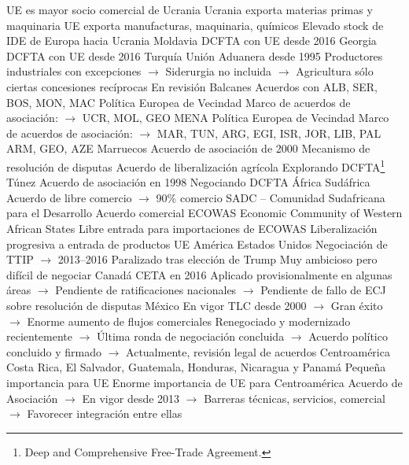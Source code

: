 \documentclass{nuevotema}
\begin{document}
\begin{esquemal}
				\4[] UE es mayor socio comercial de Ucrania
				\4[] Ucrania exporta materias primas y maquinaria
				\4[] UE exporta manufacturas, maquinaria, químicos
				\4[] Elevado stock de IDE de Europa hacia Ucrania
				\4 Moldavia
				\4[] DCFTA con UE desde 2016
				\4 Georgia
				\4[] DCFTA con UE desde 2016
				\4 Turquía
				\4[] Unión Aduanera desde 1995
				\4[] Productores industriales con excepciones
				\4[] $\to$ Siderurgia no incluida
				\4[] $\to$ Agricultura sólo ciertas concesiones recíprocas
				\4[] En revisión
				\4 Balcanes
				\4[] Acuerdos con ALB, SER, BOS, MON, MAC
				\4 Política Europea de Vecindad
				\4[] Marco de acuerdos de asociación:
				\4[] $\to$ UCR, MOL, GEO
			\3 MENA
				\4 Política Europea de Vecindad
				\4[] Marco de acuerdos de asociación:
				\4[] $\to$ MAR, TUN, ARG, EGI, ISR, JOR, LIB, PAL
				\4[] ARM, GEO, AZE
				\4 Marruecos
				\4[] Acuerdo de asociación de 2000
				\4[] Mecanismo de resolución de disputas
				\4[] Acuerdo de liberalización agrícola
				\4[] Explorando DCFTA\footnote{Deep and Comprehensive Free-Trade Agreement.}
				\4 Túnez
				\4[] Acuerdo de asociación en 1998
				\4[] Negociando DCFTA
			\3 África
				\4 Sudáfrica
				\4[] Acuerdo de libre comercio
				\4[] $\to$ 90\% comercio
				\4 SADC -- Comunidad Sudafricana para el Desarrollo
				\4[] Acuerdo comercial
				\4 ECOWAS
				\4[] Economic Community of Western African States
				\4[] Libre entrada para importaciones de ECOWAS
				\4[] Liberalización progresiva a entrada de productos UE
			\3 América
				\4 Estados Unidos
				\4[] Negociación de TTIP
				\4[] $\to$ 2013--2016
				\4[] Paralizado tras elección de Trump
				\4[] Muy ambicioso pero difícil de negociar
				\4 Canadá
				\4[] CETA en 2016
				\4[] Aplicado provisionalmente en algunas áreas
				\4[] $\to$ Pendiente de ratificaciones nacionales
				\4[] $\to$ Pendiente de fallo de ECJ sobre resolución de disputas
				\4 México
				\4[] En vigor TLC desde 2000
				\4[] $\to$ Gran éxito
				\4[] $\to$ Enorme aumento de flujos comerciales
				\4[] Renegociado y modernizado recientemente
				\4[] $\to$ Última ronda de negociación concluida
				\4[] $\to$ Acuerdo político concluido y firmado
				\4[] $\to$ Actualmente, revisión legal de acuerdos
				\4 Centroamérica
				\4[] Costa Rica, El Salvador, Guatemala,
				\4[] Honduras, Nicaragua y Panamá
				\4[] Pequeña importancia para UE
				\4[] Enorme importancia de UE para Centroamérica
				\4[] Acuerdo de Asociación
				\4[] $\to$ En vigor desde 2013
				\4[] $\to$ Barreras técnicas, servicios, comercial
				\4[] $\to$ Favorecer integración entre ellas

\end{esquemal}
\end{document}
